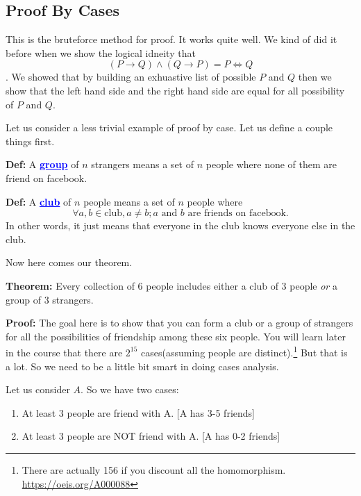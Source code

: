 \documentclass[a4paper, 12pt]{article}
\newcommand{\definition}{\noindent\textbf{Def:} }
\newcommand{\theorem}{\noindent\textbf{Theorem:} }
\renewcommand{\proof}{\noindent\textbf{Proof:} }
\newcommand{\kwd}[1]{\textcolor{blue}{\textbf{\underline{#1}}}}
\theoremstyle{examplestyle}
\begin{document}
\begin{multicols}{2}
\section*{Proof By Cases}

This is the bruteforce method for proof. It works quite well. We kind of did it before when we show the logical idneity that $$(P\to Q) \land (Q\to P) = P \iff Q$$. We showed that by building an exhuastive list of possible $P$ and $Q$ then we show that the left hand side and the right hand side are equal for all possibility of $P$ and $Q$.

Let us consider a less trivial example of proof by case. Let us define a couple things first.


\noindent\definition A \kwd{group} of $n$ strangers means a set of $n$ people where none of them are friend on facebook.


\noindent\definition A \kwd{club} of $n$ people means a set of $n$ people where
\[
	\forall a,b \in \text{club}, a\ne b; a \text{ and } b \text{ are friends on facebook}.
\]In other words, it just means that everyone in the club knows everyone else in the club.

Now here comes our theorem.

\theorem Every collection of 6 people includes either a club of 3 people \emph{or} a group of 3 strangers.

\begin{center}
\end{center}

\noindent\proof
The goal here is to show that you can form a club or a group of strangers for all the possibilities of friendship among these six people. You will learn later in the course that there are $2^{15}$ cases(assuming people are distinct).\footnote{There are actually 156 if you discount all the homomorphism. \url{https://oeis.org/A000088}} But that is a lot. So we need to be a little bit smart in doing cases analysis.


Let us consider $A$. So we have two cases:
\begin{enumerate}[1)]
	\item At least 3 people are friend with A. [A has 3-5 friends]
	\item At least 3 people are NOT friend with A. [A has 0-2 friends]
\end{enumerate}




\end{multicols}
\end{document}
